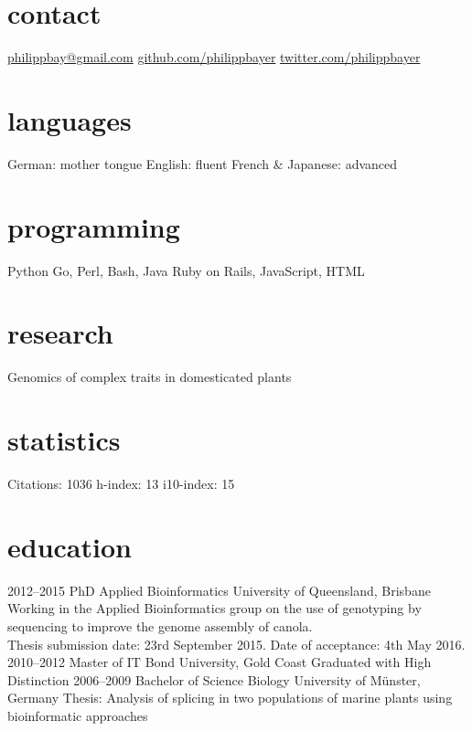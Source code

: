 \documentclass[]{friggeri-cv} %
\begin{document}


\begin{aside} %
\section{contact}
\href{mailto:philippbay@gmail.com}{philippbay@gmail.com}
\href{http://github.com/philippbayer}{github.com/philippbayer}
\href{http://twitter.com/philippbayer}{twitter.com/philippbayer}
\section{languages}
German: mother tongue
English: fluent
French \& Japanese: advanced
\section{programming}
Python
Go, Perl, Bash, Java
Ruby on Rails, JavaScript, HTML
\section{research}
Genomics of complex traits in domesticated plants
\section{statistics}
Citations: 1036
h-index: 13
i10-index: 15
\end{aside}


\section{education}

\begin{entrylist}
\entry
{2012--2015}
{PhD {\normalfont Applied Bioinformatics}}
{University of Queensland, Brisbane}
{Working in the Applied Bioinformatics group on the use of genotyping by sequencing to improve the genome assembly of canola.\\Thesis submission date: 23rd September 2015. Date of acceptance: 4th May 2016.}
\entry
{2010--2012}
{Master {\normalfont of IT}}
{Bond University, Gold Coast}
{Graduated with High Distinction}
\entry
{2006--2009}
{Bachelor of Science {\normalfont Biology}}
{University of Münster, Germany}
{Thesis: Analysis of splicing in two populations of marine plants
using bioinformatic approaches}
\end{entrylist}
\end{document}
